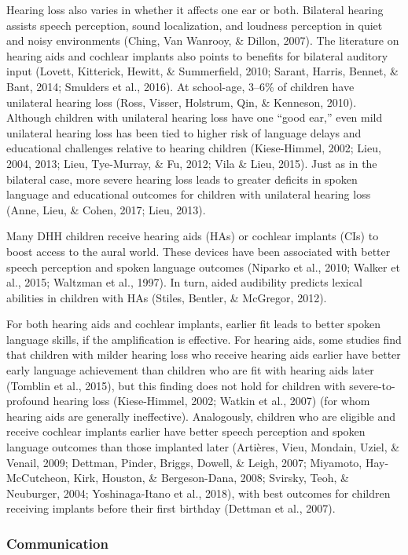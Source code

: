 \documentclass[english,man]{apa6}
\begin{document}
Hearing loss also varies in whether it affects one ear or both. Bilateral hearing assists speech perception, sound localization, and loudness perception in quiet and noisy environments (Ching, Van Wanrooy, \& Dillon, 2007). The literature on hearing aids and cochlear implants also points to benefits for bilateral auditory input (Lovett, Kitterick, Hewitt, \& Summerfield, 2010; Sarant, Harris, Bennet, \& Bant, 2014; Smulders et al., 2016). At school-age, 3--6\% of children have unilateral hearing loss (Ross, Visser, Holstrum, Qin, \& Kenneson, 2010). Although children with unilateral hearing loss have one \enquote{good ear,} even mild unilateral hearing loss has been tied to higher risk of language delays and educational challenges relative to hearing children (Kiese-Himmel, 2002; Lieu, 2004, 2013; Lieu, Tye-Murray, \& Fu, 2012; Vila \& Lieu, 2015). Just as in the bilateral case, more severe hearing loss leads to greater deficits in spoken language and educational outcomes for children with unilateral hearing loss (Anne, Lieu, \& Cohen, 2017; Lieu, 2013).

Many DHH children receive hearing aids (HAs) or cochlear implants (CIs) to boost access to the aural world. These devices have been associated with better speech perception and spoken language outcomes (Niparko et al., 2010; Walker et al., 2015; Waltzman et al., 1997). In turn, aided audibility predicts lexical abilities in children with HAs (Stiles, Bentler, \& McGregor, 2012).

For both hearing aids and cochlear implants, earlier fit leads to better spoken language skills, if the amplification is effective. For hearing aids, some studies find that children with milder hearing loss who receive hearing aids earlier have better early language achievement than children who are fit with hearing aids later (Tomblin et al., 2015), but this finding does not hold for children with severe-to-profound hearing loss (Kiese-Himmel, 2002; Watkin et al., 2007) (for whom hearing aids are generally ineffective). Analogously, children who are eligible and receive cochlear implants earlier have better speech perception and spoken language outcomes than those implanted later (Artières, Vieu, Mondain, Uziel, \& Venail, 2009; Dettman, Pinder, Briggs, Dowell, \& Leigh, 2007; Miyamoto, Hay-McCutcheon, Kirk, Houston, \& Bergeson-Dana, 2008; Svirsky, Teoh, \& Neuburger, 2004; Yoshinaga-Itano et al., 2018), with best outcomes for children receiving implants before their first birthday (Dettman et al., 2007).

\hypertarget{communication}{%
\subsubsection{Communication}\label{communication}}
\end{document}
